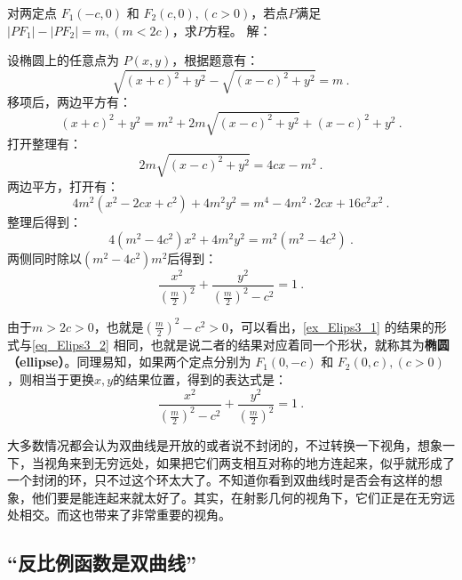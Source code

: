 \begin{example}{对两定点 $F_1(-c, 0)$ 和 $F_2(c, 0),(c>0)$，若点$P$满足$|PF_1| - |PF_2| = m,(m <2c)$，求$P$方程。}
解：

设椭圆上的任意点为 $P(x, y)$，根据题意有：
\begin{equation}
\sqrt{(x + c)^2 + y^2} - \sqrt{(x - c)^2 + y^2} = m~.
\end{equation}
移项后，两边平方有：
\begin{equation}
(x + c)^2 + y^2 = m^2 + 2m\sqrt{(x - c)^2 + y^2} + (x - c)^2 + y^2~.
\end{equation}
打开整理有：
\begin{equation}
2m\sqrt{(x - c)^2 + y^2}= 4cx - m^2~.
\end{equation}
两边平方，打开有：
\begin{equation}
4m^2(x^2 - 2cx+c^2) + 4m^2y^2= m^4-4m^2\cdot2cx+16c^2x^2~.
\end{equation}
整理后得到：
\begin{equation}
4(m^2 -4c^2)x^2 + 4m^2y^2= m^2(m^2-4c^2)~.
\end{equation}
两侧同时除以$(m^2-4c^2)m^2$后得到：
\begin{equation}
\frac{x^2}{\left(\displaystyle\frac{m}{2}\right)^2} + \frac{y^2}{\displaystyle\left(\frac{m}{2}\right)^2-c^2}=1~.
\end{equation}
\end{example}

由于$m>2c>0$，也就是$\displaystyle\left(\frac{m}{2}\right)^2-c^2>0$，可以看出，\autoref{ex_Elips3_1} 的结果的形式与\autoref{eq_Elips3_2} 相同，也就是说二者的结果对应着同一个形状，就称其为\textbf{椭圆（ellipse）}。同理易知，如果两个定点分别为 $F_1(0,-c)$ 和 $F_2(0,c),(c>0)$，则相当于更换$x,y$的结果位置，得到的表达式是：
\begin{equation}
\frac{x^2}{\displaystyle\left(\frac{m}{2}\right)^2-c^2}+\frac{y^2}{\left(\displaystyle\frac{m}{2}\right)^2} =1~.
\end{equation}


大多数情况都会认为双曲线是开放的或者说不封闭的，不过转换一下视角，想象一下，当视角来到无穷远处，如果把它们两支相互对称的地方连起来，似乎就形成了一个封闭的环，只不过这个环太大了。不知道你看到双曲线时是否会有这样的想象，他们要是能连起来就太好了。其实，在射影几何的视角下，它们正是在无穷远处相交。而这也带来了非常重要的视角。

\subsection{“反比例函数是双曲线”}

